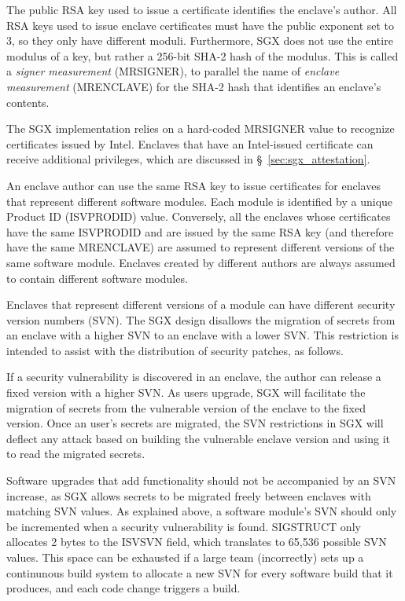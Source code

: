 
The public RSA key used to issue a certificate identifies the enclave's author.
All RSA keys used to issue enclave certificates must have the public exponent
set to 3, so they only have different moduli. Furthermore, SGX does not use
the entire modulus of a key, but rather a 256-bit SHA-2 hash of the modulus.
This is called a \textit{signer measurement} (MRSIGNER), to parallel the name
of \textit{enclave measurement} (MRENCLAVE) for the SHA-2 hash that identifies
an enclave's contents.

The SGX implementation relies on a hard-coded MRSIGNER value to recognize
certificates issued by Intel. Enclaves that have an Intel-issued certificate
can receive additional privileges, which are discussed in
\S~\ref{sec:sgx_attestation}.

An enclave author can use the same RSA key to issue certificates for enclaves
that represent different software modules. Each module is identified by a
unique Product ID (ISVPRODID) value. Conversely, all the enclaves whose
certificates have the same ISVPRODID and are issued by the same RSA key
(and therefore have the same MRENCLAVE) are assumed to represent different
versions of the same software module. Enclaves created by different authors are
always assumed to contain different software modules.


Enclaves that represent different versions of a module can have different
security version numbers (SVN). The SGX design disallows the migration of
secrets from an enclave with a higher SVN to an enclave with a lower SVN. This
restriction is intended to assist with the distribution of security patches,
as follows.

If a security vulnerability is discovered in an enclave, the author can release
a fixed version with a higher SVN. As users upgrade, SGX will facilitate the
migration of secrets from the vulnerable version of the enclave to the fixed
version. Once an user's secrets are migrated, the SVN restrictions in SGX will
deflect any attack based on building the vulnerable enclave version and using
it to read the migrated secrets.

Software upgrades that add functionality should not be accompanied by an SVN
increase, as SGX allows secrets to be migrated freely between enclaves with
matching SVN values. As explained above, a software module's SVN should only be
incremented when a security vulnerability is found. SIGSTRUCT only allocates
2 bytes to the ISVSVN field, which translates to 65,536 possible SVN values.
This space can be exhausted if a large team (incorrectly) sets up a continunous
build system to allocate a new SVN for every software build that it produces,
and each code change triggers a build.


